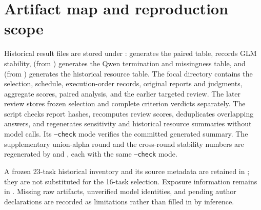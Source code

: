 \documentclass[11pt]{article}
\begin{document}
\section{Artifact map and reproduction scope}
Historical result files are stored under :  generates the paired table,  records GLM stability,  (from ) generates the Qwen termination and missingness table, and  (from ) generates the historical resource table. The focal directory contains the selection, schedule, execution-order records, original reports and judgments, aggregate scores, paired analysis, and the earlier targeted review. The later review stores frozen selection and complete criterion verdicts separately. The script  checks report hashes, recomputes review scores, deduplicates overlapping answers, and regenerates sensitivity and historical resource summaries without model calls. Its \texttt{--check} mode verifies the committed generated summary. The supplementary union-alpha round and the cross-round stability numbers are regenerated by  and , each with the same \texttt{--check} mode.

A frozen 23-task historical inventory and its source metadata are retained in ; they are not substituted for the 16-task selection. Exposure information remains in . Missing raw artifacts, unverified model identities, and pending author declarations are recorded as limitations rather than filled in by inference.
\end{document}
